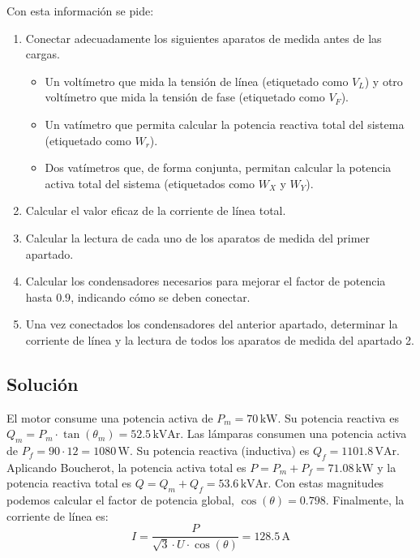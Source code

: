 Con esta información se pide:
\begin{enumerate}
\item Conectar adecuadamente los siguientes aparatos de medida antes
  de las cargas.
  \begin{itemize}
  \item Un voltímetro que mida la tensión de línea (etiquetado como
    $V_L$) y otro voltímetro que mida la tensión de fase (etiquetado
    como $V_F$).
  \item Un vatímetro que permita calcular la potencia reactiva total
    del sistema (etiquetado como $W_r$).
  \item Dos vatímetros que, de forma conjunta, permitan calcular la
    potencia activa total del sistema (etiquetados como $W_X$ y
    $W_Y$).
  \end{itemize}
\item Calcular el valor eficaz de la corriente de línea
  total.
\item Calcular la lectura de cada uno de los aparatos
  de medida del primer apartado.
\item Calcular los condensadores necesarios para
  mejorar el factor de potencia hasta $0.9$, indicando cómo se deben
  conectar.
\item Una vez conectados los condensadores del anterior
  apartado, determinar la corriente de línea y la lectura de todos los
  aparatos de medida del apartado 2.
\end{enumerate}

\subsection*{Solución}

El motor consume una potencia activa de $P_m = 70\,\mathrm{kW}$. Su
potencia reactiva es
$Q_m = P_m \cdot \tan(\theta_m) = 52.5\,\mathrm{kVAr}$.  Las lámparas
consumen una potencia activa de $P_f = 90 \cdot 12 =
1080\,\mathrm{W}$. Su potencia reactiva (inductiva) es
$Q_f = 1101.8\,\mathrm{VAr}$.  Aplicando Boucherot, la potencia activa
total es $P = P_m + P_f = 71.08\,\mathrm{kW}$ y la potencia reactiva
total es $Q = Q_m + Q_f = 53.6\,\mathrm{kVAr}$. Con estas magnitudes
podemos calcular el factor de potencia global, $\cos(\theta) =
0.798$. Finalmente, la corriente de línea es:
\[
  I = \frac{P}{\sqrt3 \cdot U \cdot \cos(\theta)} = 128.5\,\mathrm{A}
\]



